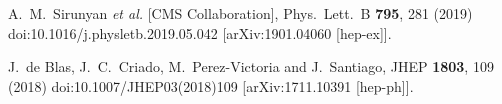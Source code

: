 \documentclass[10pt]{article}
\begin{document}
\begin{thebibliography}{99}
  A.~M.~Sirunyan {\it et al.} [CMS Collaboration],
  Phys.\ Lett.\ B {\bf 795}, 281 (2019)
  doi:10.1016/j.physletb.2019.05.042
  [arXiv:1901.04060 [hep-ex]].

  J.~de Blas, J.~C.~Criado, M.~Perez-Victoria and J.~Santiago,
  JHEP {\bf 1803}, 109 (2018)
  doi:10.1007/JHEP03(2018)109
  [arXiv:1711.10391 [hep-ph]].


\end{thebibliography}

 
\end{document}
